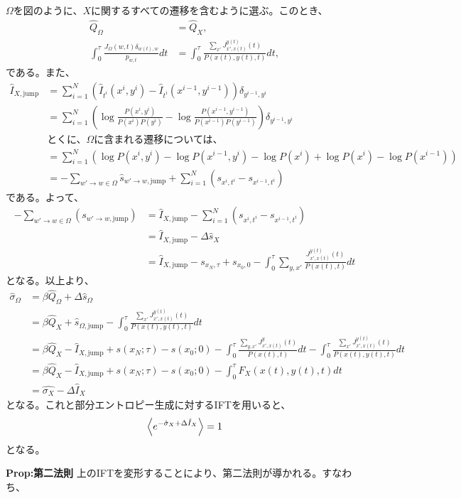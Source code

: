 \documentclass[a4paper,11pt]{jsarticle}
\numberwithin{equation}{section}
\begin{document}
$\Omega$を図のように、$X$に関するすべての遷移を含むように選ぶ。このとき、
\begin{align}
    \hat{Q}_{\Omega} &= \hat{Q}_{X}, \\
    \int_{0}^{\tau} \frac{J_{\Omega}(w,t) \delta_{w(t),w}}{p_{w,t}} dt &= \int_{0}^{\tau} \frac{\sum_{x'} J_{x',x(t)}^{y(t)}(t)}{P(x(t), y(t), t)} dt,
\end{align}
である。また、
\begin{align}
    \hat{I}_{X,\text{jump}} &= \sum_{i=1}^{N} \left(\hat{I}_{t^i}(x^{i}, y^{i}) - \hat{I}_{t^i}(x^{i-1}, y^{i-1})\right)\delta_{y^{i-1}, y^{i}} \\
    &= \sum_{i=1}^{N} \left(\log \frac{P(x^{i}, y^{i})}{P(x^{i})P(y^{i})} - \log \frac{P(x^{i-1}, y^{i-1})}{P(x^{i-1})P(y^{i-1})}\right)\delta_{y^{i-1}, y^{i}} \\
    &\text{とくに、$\Omega$に含まれる遷移については、}\\
    &= \sum_{i=1}^{N} \left(\log P(x^{i}, y^{i}) - \log P(x^{i-1}, y^{i}) - \log P(x^{i}) + \log P(x^{i}) - \log P(x^{i-1}) \right)\\
    &= -\sum_{w' \to w \in \Omega} \hat{s}_{w' \to w, \text{jump}} + \sum_{i=1}^{N} (s_{x^{i}, t^i} - s_{x^{i-1}, t^i})
\end{align}
である。よって、
\begin{align}
    -\sum_{w' \to w \in \Omega} (s_{w' \to w, \text{jump}} ) &= \hat{I}_{X,\text{jump}} -\sum_{i=1}^{N} (s_{x^{i}, t^i} - s_{x^{i-1}, t^i})\\
    &= \hat{I}_{X,\text{jump}} - \Delta \hat{s}_{X}\\
    &= \hat{I}_{X,\text{jump}} - s_{x_N, \tau} + s_{x_0, 0} - \int_{0}^{\tau} \sum_{y,x'} \frac{J_{x',x(t)}^{y(t)}(t)}{P(x(t), t)} dt
\end{align}
となる。以上より、
\begin{align}
    \hat{\sigma}_{\Omega} &= \beta \hat{Q}_{\Omega} + \Delta \hat{s}_{\Omega} \\
    &= \beta \hat{Q}_{X} + \hat{s}_{\Omega, \text{jump}} - \int_{0}^{\tau} \frac{\sum_{x'} J_{x',x(t)}^{y(t)}(t)}{P(x(t), y(t), t)} dt \\
    &= \beta \hat{Q}_{X} - \hat{I}_{X,\text{jump}} + s(x_{N}; \tau) - s(x_0; 0) - \int_{0}^{\tau} \frac{\sum_{y,x'} J_{x',x(t)}^{y}(t)}{P(x(t), t)} dt -\int_{0}^{\tau} \frac{\sum_{x'} J_{x',x(t)}^{y(t)}(t)}{P(x(t), y(t), t)} dt\\
    &= \beta \hat{Q}_{X} - \hat{I}_{X,\text{jump}} + s(x_{N}; \tau) - s(x_0; 0) - \int_{0}^{\tau} F_X(x(t), y(t), t) dt\\
    &= \hat{\sigma_X} - \Delta \hat{I}_X
\end{align}
となる。これと部分エントロピー生成に対するIFTを用いると、
\begin{align}
    \ev{e^{-\hat{\sigma}_X + \Delta \hat{I}_X}} = 1
\end{align}
となる。\hfill\qedsymbol\\

\begin{itembox}[l]{\textbf{Prop:第二法則}}
上のIFTを変形することにより、第二法則が導かれる。すなわち、

\end{itembox}
\end{document}
